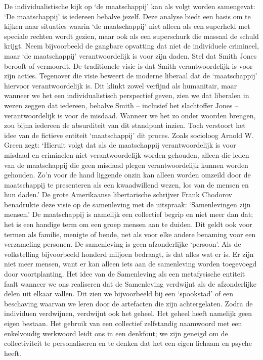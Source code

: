 \documentclass[
  a5paper,
  smalldemyvopaper,10pt,twoside,onecolumn,openright,extrafontsizes,hidelinks]{memoir}
\begin{document}
De individualistische kijk op `de maatschappij' kan als volgt worden
samengevat: `De maatschappij' is iedereen behalve jezelf. Deze analyse
biedt een basis om te kijken naar situaties waarin `de maatschappij'
niet alleen als een superheld met speciale rechten wordt gezien, maar
ook als een superschurk die massaal de schuld krijgt. Neem bijvoorbeeld
de gangbare opvatting dat niet de individuele crimineel, maar `de
maatschappij' verantwoordelijk is voor zijn daden. Stel dat Smith Jones
berooft of vermoordt. De traditionele visie is dat Smith
verantwoordelijk is voor zijn acties. Tegenover die visie beweert de
moderne liberaal dat de `maatschappij' hiervoor verantwoordelijk is. Dit
klinkt zowel verfijnd als humanitair, maar wanneer we het een
individualistisch perspectief geven, zien we dat liberalen in wezen
zeggen dat iedereen, behalve Smith -- inclusief het slachtoffer Jones --
verantwoordelijk is voor de misdaad. Wanneer we het zo onder woorden
brengen, zou bijna iedereen de absurditeit van dit standpunt inzien.
Toch verstoort het idee van de fictieve entiteit `maatschappij' dit
proces. Zoals socioloog Arnold W. Green zegt: `Hieruit volgt dat als de
maatschappij verantwoordelijk is voor misdaad en criminelen niet
verantwoordelijk worden gehouden, alleen die leden van de maatschappij
die geen misdaad plegen verantwoordelijk kunnen worden gehouden. Zo'n
voor de hand liggende onzin kan alleen worden omzeild door de
maatschappij te presenteren als een kwaadwillend wezen, los van de
mensen en hun daden.' De grote Amerikaanse libertarische schrijver Frank
Chodorov benadrukte deze visie op de samenleving met de uitspraak:
`Samenlevingen zijn mensen.' De maatschappij is namelijk een collectief
begrip en niet meer dan dat; het is een handige term om een groep mensen
aan te duiden. Dit geldt ook voor termen als familie, menigte of bende,
net als voor elke andere benaming voor een verzameling personen. De
samenleving is geen afzonderlijke `persoon'. Als de volkstelling
bijvoorbeeld honderd miljoen bedraagt, is dat alles wat er is. Er zijn
niet meer mensen, want er kan alleen iets aan de samenleving worden
toegevoegd door voortplanting. Het idee van de Samenleving als een
metafysische entiteit faalt wanneer we ons realiseren dat de Samenleving
verdwijnt als de afzonderlijke delen uit elkaar vallen. Dit zien we
bijvoorbeeld bij een `spookstad' of een beschaving waarvan we leren door
de artefacten die zijn achtergelaten. Zodra de individuen verdwijnen,
verdwijnt ook het geheel. Het geheel heeft namelijk geen eigen bestaan.
Het gebruik van een collectief zelfstandig naamwoord met een enkelvoudig
werkwoord leidt ons in een denkfout; we zijn geneigd om de
collectiviteit te personaliseren en te denken dat het een eigen lichaam
en psyche heeft.
\end{document}
